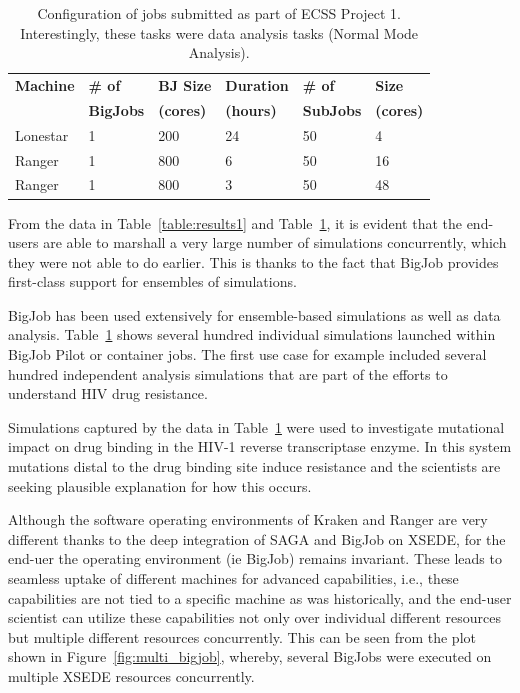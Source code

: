 \documentclass{sig-alternate}
\begin{document}
\begin{table}[h]
\begin{center}
\begin{tabular}{p{1.1cm}p{1.2cm}p{1.2cm}p{1.2cm}p{1.1cm}p{0.8cm}}
\toprule
\textbf{Machine}  & 
\textbf{\# of}    &
\textbf{BJ Size}     & 
\textbf{Duration} & 
\textbf{\# of}    &
\textbf{Size}     \\
                  &
\textbf{BigJobs}  &
\textbf{(cores)} &
\textbf{(hours)}  &
\textbf{SubJobs}  &
\textbf{(cores)} 
                  \\ \midrule
Lonestar & 1 &  200 & 24 &  50 &  4 \\ \midrule
Ranger   & 1 &  800 &  6 &  50 & 16 \\ \midrule
Ranger   & 1 &  800 &  3 &  50 & 48 \\ \bottomrule
\end{tabular}
\caption{Configuration of jobs submitted as part of ECSS Project
  1. Interestingly, these tasks were data analysis tasks (Normal Mode
  Analysis).}
\label{table:results}
\end{center}
 \end{table}

From the data in Table~\ref{table:results1} and
Table~\ref{table:results}, it is evident that the end-users are able
to marshall a very large number of simulations concurrently, which
they were not able to do earlier. This is thanks to the fact that
BigJob provides first-class support for ensembles of simulations.

BigJob has been used extensively for ensemble-based simulations as well as data
analysis. Table~\ref{table:results} shows several hundred individual simulations
launched within BigJob Pilot or container jobs. The first use case for example
included several hundred independent analysis simulations that are part of the
efforts to understand HIV drug resistance.

Simulations captured by the data in Table~\ref{table:results} were
used to investigate mutational impact on drug binding in the HIV-1
reverse transcriptase enzyme. In this system mutations distal to the
drug binding site induce resistance and the scientists are seeking
plausible explanation for how this occurs.

Although the software operating environments of Kraken and Ranger are
very different thanks to the deep integration of SAGA and BigJob on
XSEDE, for the end-uer the operating environment (ie BigJob) remains
invariant.  These leads to seamless uptake of different machines for
advanced capabilities, i.e., these capabilities are not tied to a
specific machine as was historically, and the end-user scientist can
utilize these capabilities not only over individual different
resources but multiple different resources concurrently. This can be
seen from the plot shown in Figure~\ref{fig:multi_bigjob}, whereby,
several BigJobs were executed on multiple XSEDE resources
concurrently.
\end{document}
